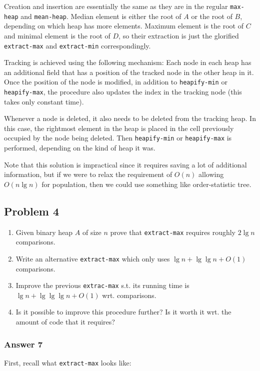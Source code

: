 \documentclass[11pt]{article}
\begin{document}
Creation and insertion are essentially the same as they are in the regular
\texttt{max-heap} and \texttt{mean-heap}.  Median element is either the root of \(A\) or the
root of \(B\), depending on which heap has more elements.  Maximum element is
the root of \(C\) and minimal element is the root of \(D\), so their extraction
is just the glorified \texttt{extract-max} and \texttt{extract-min} correspondingly.

Tracking is achieved using the following mechanism: Each node in each heap
has an additional field that has a position of the tracked node in the other
heap in it.  Once the position of the node is modified, in addition to
\texttt{heapify-min} or \texttt{heapify-max}, the procedure also updates the index in the
tracking node (this takes only constant time).

Whenever a node is deleted, it also needs to be deleted from the tracking
heap.  In this case, the rightmost element in the heap is placed in the cell
previously occupied by the node being deleted.  Then \texttt{heapify-min} or
\texttt{heapify-max} is performed, depending on the kind of heap it was.

Note that this solution is impractical since it requires saving a lot of
additional information, but if we were to relax the requirement of \(O(n)\)
allowing \(O(n \lg n)\) for population, then we could use something like
order-statistic tree.

\subsection{Problem 4}
\label{sec:orgheadline15}
\begin{enumerate}
\item Given binary heap \(A\) of size \(n\) prove that \texttt{extract-max} requires
roughly \(2\lg n\) comparisons.
\item Write an alternative \texttt{extract-max} which only uses \(\lg n + \lg \lg n +
      O(1)\) comparisons.
\item Improve the previous \texttt{extrac-max} s.t. its running time is \(\lg n + \lg
      \lg \lg n + O(1)\) wrt. comparisons.
\item Is it possible to improve this procedure further?  Is it worth it wrt. the
amount of code that it requires?
\end{enumerate}

\subsubsection{Answer 7}
\label{sec:orgheadline11}
First, recall what \texttt{extract-max} looks like:
\end{document}
